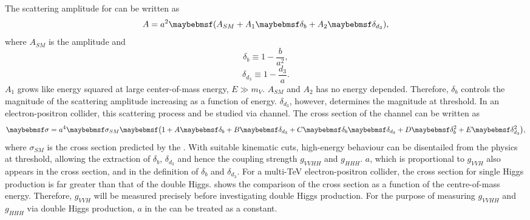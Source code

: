 The scattering amplitude for  can be written as
\begin{equation}
A = a^2\parenths{A_{SM} + A_1\delta_b + A_2\delta_{d_3}},
\end{equation}
where $A_{SM}$ is the \SM amplitude and 
\begin{equation}
\delta_b \equiv 1 - \frac{b}{a^2},
\end{equation}
\begin{equation}
\delta_{d_3} \equiv 1 - \frac{d_3}{a}.
\end{equation}
$A_1$ grows like energy squared at large center-of-mass energy, $E\gg{m_V}$. $A_{SM}$ and $A_2$ has no energy depended. Therefore, $\delta_b$ controls the magnitude of the scattering amplitude increasing as a function of energy. $\delta_{d_3}$, however, determines the magnitude at threshold. In an electron-positron collider, this scattering process and be studied via  channel. The cross section of the channel can be written as 
\begin{equation}
\label{eq:theoryGeneralHiggsCrossSection}
\sigma = a^4\sigma_{SM}\parenths{1 + A\delta_b + B\delta_{d_3} + C\delta_b\delta_{d_3} + D\delta_b^2 + E\delta_{d_3}^2},
\end{equation}
where $\sigma_{SM}$ is the cross section predicted by the \SM. With suitable kinematic cuts, high-energy behaviour can be disentailed from the physics at threshold, allowing the extraction of $\delta_{b}$, $\delta_{d_3}$ and hence the coupling strength $g_{VVHH}$ and $g_{HHH}$. $a$, which is proportional to $g_{VVH}$ also appears in the cross section, and in the definition of $\delta_{b}$ and $\delta_{d_3}$. For a multi-TeV electron-positron collider, the cross section for single Higgs production is far greater than that of the double Higgs. \FIGURE{} shows the comparison of the cross section as a function of the centre-of-mass energy. Therefore, $g_{VVH}$ will be measured precisely before investigating double Higgs production. For the purpose of measuring $g_{VVHH}$ and $g_{HHH}$ via double Higgs production, $a$ in the  can be treated as a constant.

